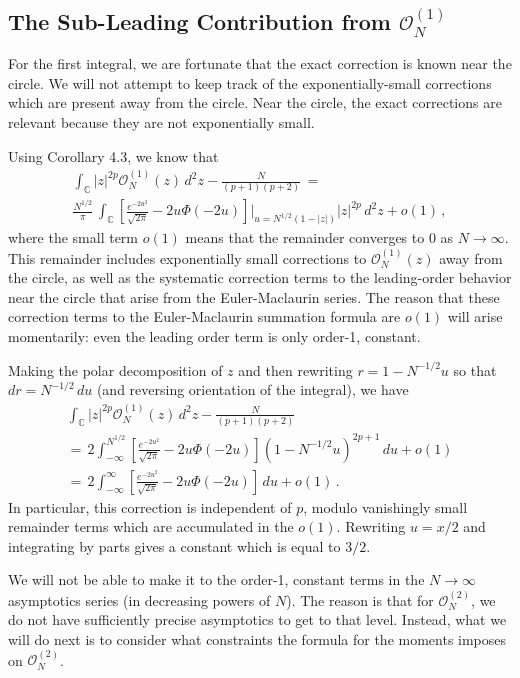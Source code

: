 \documentclass[12pt]{report}
\newcommand{\C}{\mathbb{C}}
\newcommand{\be}{\begin{equation}}
\newcommand{\ee}{\end{equation}}
\theoremstyle{definition}
\begin{document}
\subsection{The Sub-Leading Contribution from $\mathcal{O}_N^{(1)}$}
\label{subsec:sLO1}
For the first integral, we are fortunate that the exact correction is known near the circle.
We will not attempt to keep track of the exponentially-small corrections which are present away from the circle.
Near the circle, the exact corrections are relevant because they are not exponentially small.

Using Corollary 4.3, we know that
\begin{multline}
\int_{\C} |z|^{2p} \mathcal{O}_N^{(1)}(z)\, d^2z
- \frac{N}{(p+1)(p+2)}\, =\,\\ \frac{N^{1/2}}{\pi}\, \int_{\C} \left[\frac{e^{-2u^2}}{\sqrt{2\pi}} - 2 u \Phi(-2u)\right]\Bigg|_{u = N^{1/2} (1-|z|)} |z|^{2p}\, d^2z
+ o(1)\, ,
\end{multline}
where the small term $o(1)$ means that the remainder converges to $0$ as $N \to \infty$.
This remainder includes exponentially small corrections to $\mathcal{O}_N^{(1)}(z)$ away from the circle, as well as the systematic correction terms to the leading-order
behavior near the circle that arise from the Euler-Maclaurin series.
The reason that these correction terms to the Euler-Maclaurin summation formula are $o(1)$ will arise momentarily: even the leading order term is only order-1, constant.

Making the polar decomposition of $z$ and then rewriting $r = 1-N^{-1/2}u$ so that $dr=N^{-1/2}\, du$ (and reversing orientation of the integral), we have
\be
\begin{split}
\int_{\C} |z|^{2p} \mathcal{O}_N^{(1)}(z)\, d^2z
- \frac{N}{(p+1)(p+2)}\, \\
=\, 2 \int_{-\infty}^{N^{1/2}} \left[\frac{e^{-2u^2}}{\sqrt{2\pi}} - 2 u \Phi(-2u)\right](1-N^{-1/2}u)^{2p+1}\, du+ o(1)\\
=\, 2 \int_{-\infty}^{\infty} \left[\frac{e^{-2u^2}}{\sqrt{2\pi}} - 2 u \Phi(-2u)\right]\, du+ o(1)\, .
\end{split}
\ee
In particular, this correction is independent of $p$, modulo vanishingly small remainder terms which are accumulated in the $o(1)$.
Rewriting $u=x/2$ and integrating by parts gives a constant which is equal to $3/2$.

We will not be able to make it to the order-1, constant terms in the $N\to \infty$ asymptotics series (in decreasing powers of $N$).
The reason is that for $\mathcal{O}_N^{(2)}$, we do not have sufficiently precise asymptotics to get to that level.
Instead, what we will do next is to consider what constraints the formula for the moments imposes on $\mathcal{O}_N^{(2)}$.
\end{document}
